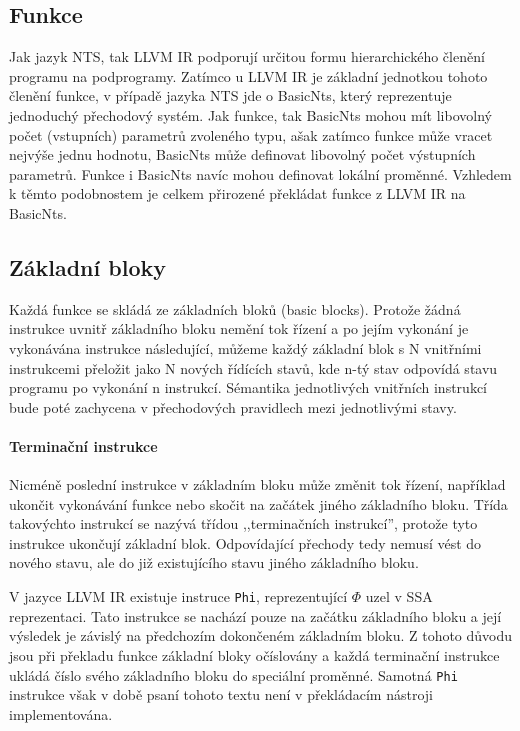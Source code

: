 \documentclass[12pt]{fithesis2}
\begin{document}
\subsection{Funkce}
Jak jazyk NTS, tak LLVM IR podporují určitou formu hierarchického členění programu na podprogramy. Zatímco u LLVM IR je základní jednotkou tohoto členění funkce, v případě jazyka NTS jde o BasicNts, který reprezentuje jednoduchý přechodový systém. Jak funkce, tak BasicNts mohou mít libovolný počet (vstupních) parametrů zvoleného typu, ašak zatímco funkce může vracet nejvýše jednu hodnotu, BasicNts může definovat libovolný počet výstupních parametrů. Funkce i BasicNts navíc mohou definovat lokální proměnné. Vzhledem k těmto podobnostem je celkem přirozené překládat funkce z LLVM IR na BasicNts.

\subsection{Základní bloky}
Každá funkce se skládá ze základních bloků (basic blocks). Protože žádná instrukce uvnitř základního bloku nemění tok řízení a po jejím vykonání je vykonávána instrukce následující, můžeme každý základní blok s N vnitřními instrukcemi přeložit jako N nových řídících stavů, kde n-tý stav odpovídá stavu programu po vykonání n instrukcí. Sémantika jednotlivých vnitřních instrukcí bude poté zachycena v přechodových pravidlech mezi jednotlivými stavy.

\paragraph{Terminační instrukce}
Nicméně poslední instrukce v základním bloku může změnit tok řízení, například ukončit vykonávání funkce nebo skočit na začátek jiného základního bloku. Třída takovýchto instrukcí se nazývá třídou ,,terminačních instrukcí'', protože tyto instrukce ukončují základní blok. Odpovídající přechody tedy nemusí vést do nového stavu, ale do již existujícího stavu jiného základního bloku.

V jazyce LLVM IR existuje instruce \texttt{Phi}, reprezentující $\Phi$ uzel v SSA reprezentaci. Tato instrukce se nachází pouze na začátku základního bloku a její výsledek je závislý na předchozím dokončeném základním bloku. Z tohoto důvodu jsou při překladu funkce základní bloky očíslovány a každá terminační instrukce ukládá číslo svého základního bloku do speciální proměnné. Samotná \texttt{Phi} instrukce však v době psaní tohoto textu není v překládacím nástroji implementována.
\end{document}
